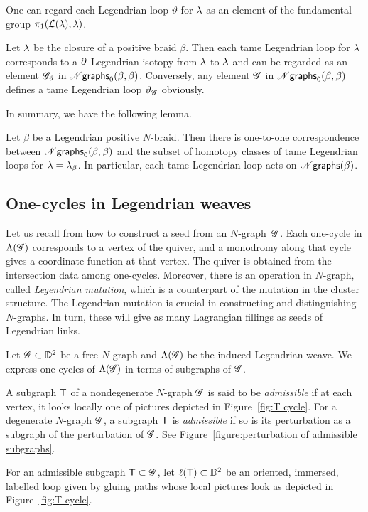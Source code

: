 \begin{remark}
One can regard each Legendrian loop $\vartheta$ for $\lambda$ as an element of the fundamental group $\pi_1(\mathcal{L}(\lambda), \lambda)$.
\end{remark}

Let $\lambda$ be the closure of a positive braid $\beta$.
Then each tame Legendrian loop for $\lambda$ corresponds to a $\partial$-Legendrian isotopy from $\lambda$ to $\lambda$ and can be regarded as an element $\mathscr{G}_\vartheta$ in $\mathscr{N}\mathsf{graphs}_0(\beta,\beta)$.
Conversely, any element $\mathscr{G}$ in $\mathscr{N}\mathsf{graphs}_0(\beta,\beta)$ defines a tame Legendrian loop $\vartheta_\mathscr{G}$ obviously.

In summary, we have the following lemma.
\begin{lemma}\label{lemma:Legendrian loops and tame annular Ngraphs}
Let $\beta$ be a Legendrian positive $N$-braid. Then there is one-to-one correspondence between $\mathscr{N}\mathsf{graphs}_0(\beta,\beta)$ and the subset of homotopy classes of tame Legendrian loops for $\lambda=\lambda_\beta$.
In particular, each tame Legendrian loop acts on $\mathscr{N}\mathsf{graphs}(\beta)$.
\end{lemma}


\subsection{One-cycles in Legendrian weaves}\label{sec:1-cycles in Legendrian weaves}
Let us recall from \cite{CZ2020} how to construct a seed from an $N$-graph~$\mathscr{G}$.
Each one-cycle in $\Lambda(\mathscr{G})$ corresponds to a vertex of the quiver,
and a monodromy along that cycle gives a coordinate function at that vertex.
The quiver is obtained from the intersection data among one-cycles.
Moreover, there is an operation in $N$-graph, called \emph{Legendrian mutation}, which is a counterpart of the mutation in the cluster structure.
The Legendrian mutation is crucial in constructing and distinguishing $N$-graphs.
In turn, these will give as many Lagrangian fillings as seeds of Legendrian links.


Let $\mathscr{G}\subset \mathbb{D}^2$ be a free $N$-graph and $\Lambda(\mathscr{G})$ be the induced Legendrian weave.
We express one-cycles of $\Lambda(\mathscr{G})$ in terms of subgraphs of $\mathscr{G}$.

\begin{definition}
A subgraph $\mathsf{T}$ of a nondegenerate $N$-graph $\mathscr{G}$ is said to be \emph{admissible} if at each vertex, it looks locally one of pictures depicted in Figure~\ref{fig:T cycle}.
For a degenerate $N$-graph $\mathscr{G}$, a subgraph $\mathsf{T}$ is \emph{admissible} if so is its perturbation as a subgraph of the perturbation of $\mathscr{G}$. See Figure~\ref{figure:perturbation of admissible subgraphs}.

For an admissible subgraph $\mathsf{T}\subset\mathscr{G}$, let $\ell(\mathsf{T})\subset\mathbb{D}^2$ be an oriented, immersed, labelled loop given by gluing paths whose local pictures look as depicted in Figure~\ref{fig:T cycle}.
\end{definition}

